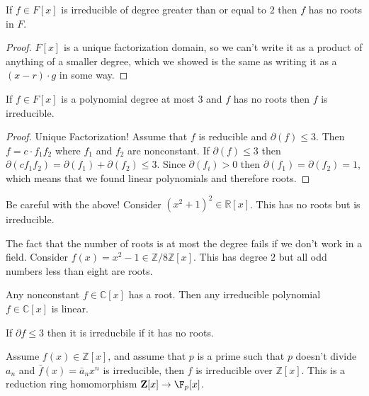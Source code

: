 \begin{proposition}
If $f \in F[x]$ is irreducible of degree greater than or equal to $2$ then $f$ has no roots in $F$.
\end{proposition}

\begin{proof}
$F[x]$ is a unique factorization domain, so we can't write it as a product of anything of a smaller degree, which we showed is the same as writing it as a $(x-r) \cdot g$ in some way.
\end{proof}

\begin{proposition}
If $f \in F[x]$ is a polynomial degree at most $3$ and $f$ has no roots then $f$ is irreducible.
\end{proposition}

\begin{proof}
Unique Factorization! Assume that $f$ is reducible and $\partial(f) \leq 3$. Then $f = c \cdot f_1 f_2$ where $f_1$ and $f_2$ are nonconstant. If $\partial(f) \leq 3$ then $\partial(cf_1f_2) = \partial(f_1) + \partial(f_2) \leq 3$. Since $\partial(f_i) > 0$ then $\partial(f_1) = \partial(f_2) = 1$, which means that we found linear polynomials and therefore roots. 
\end{proof}

\begin{example}[Warning]
Be careful with the above! Consider $(x^2+1)^2 \in \mathbb{R}[x]$. This has no roots but is irreducible.
\end{example}

\begin{example}[Warning]
The fact that the number of roots is at most the degree fails if we don't work in a field. Consider $f(x) = x^2 - 1 \in \mathbb{Z}/8\mathbb{Z}[x]$. This has degree $2$ but all odd numbers less than eight are roots.
\end{example}

\begin{theorem}
Any nonconstant $f \in \mathbb{C}[x]$ has a root. Then any irreducible polynomial $f \in \mathbb{C}[x]$ is linear.
\end{theorem}

\begin{problem}
\begin{parts}
\item If $\partial f \leq 3$ then it is irreducbile if it has no roots.
\item 
\begin{theorem}
Assume $f(x) \in \mathbb{Z}[x]$, and assume that $p$ is a prime such that $p$ doesn't divide $a_n$ and $\bar{f}(x) = \bar{a}_nx^n$ is irreducible, then $f$ is irreducible over $\mathbb{Z}[x]$. This is a reduction ring homomorphism $\mathbb{Z}[x] \to \F_p[x]$.
\end{theorem}
\end{parts}
\end{problem}